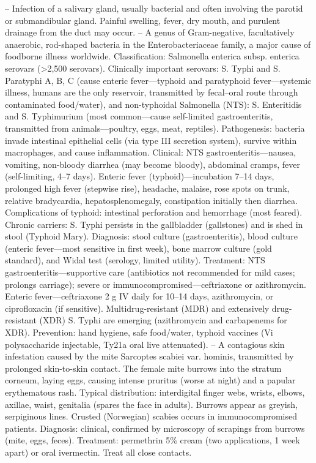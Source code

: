 -- Infection of a salivary gland, usually bacterial and often involving the parotid or submandibular gland. Painful swelling, fever, dry mouth, and purulent drainage from the duct may occur.
-- A genus of Gram-negative, facultatively anaerobic, rod-shaped bacteria in the Enterobacteriaceae family, a major cause of foodborne illness worldwide. Classification: Salmonella enterica subsp. enterica serovars (>2,500 serovars). Clinically important serovars: S. Typhi and S. Paratyphi A, B, C (cause enteric fever—typhoid and paratyphoid fever—systemic illness, humans are the only reservoir, transmitted by fecal–oral route through contaminated food/water), and non-typhoidal Salmonella (NTS): S. Enteritidis and S. Typhimurium (most common—cause self-limited gastroenteritis, transmitted from animals—poultry, eggs, meat, reptiles). Pathogenesis: bacteria invade intestinal epithelial cells (via type III secretion system), survive within macrophages, and cause inflammation. Clinical: NTS gastroenteritis—nausea, vomiting, non-bloody diarrhea (may become bloody), abdominal cramps, fever (self-limiting, 4--7 days). Enteric fever (typhoid)—incubation 7--14 days, prolonged high fever (stepwise rise), headache, malaise, rose spots on trunk, relative bradycardia, hepatosplenomegaly, constipation initially then diarrhea. Complications of typhoid: intestinal perforation and hemorrhage (most feared). Chronic carriers: S. Typhi persists in the gallbladder (gallstones) and is shed in stool (Typhoid Mary). Diagnosis: stool culture (gastroenteritis), blood culture (enteric fever—most sensitive in first week), bone marrow culture (gold standard), and Widal test (serology, limited utility). Treatment: NTS gastroenteritis—supportive care (antibiotics not recommended for mild cases; prolongs carriage); severe or immunocompromised—ceftriaxone or azithromycin. Enteric fever—ceftriaxone 2 g IV daily for 10--14 days, azithromycin, or ciprofloxacin (if sensitive). Multidrug-resistant (MDR) and extensively drug-resistant (XDR) S. Typhi are emerging (azithromycin and carbapenems for XDR). Prevention: hand hygiene, safe food/water, typhoid vaccines (Vi polysaccharide injectable, Ty21a oral live attenuated).
-- A contagious skin infestation caused by the mite Sarcoptes scabiei var. hominis, transmitted by prolonged skin-to-skin contact. The female mite burrows into the stratum corneum, laying eggs, causing intense pruritus (worse at night) and a papular erythematous rash. Typical distribution: interdigital finger webs, wrists, elbows, axillae, waist, genitalia (spares the face in adults). Burrows appear as greyish, serpiginous lines. Crusted (Norwegian) scabies occurs in immunocompromised patients. Diagnosis: clinical, confirmed by microscopy of scrapings from burrows (mite, eggs, feces). Treatment: permethrin 5\% cream (two applications, 1 week apart) or oral ivermectin. Treat all close contacts.
